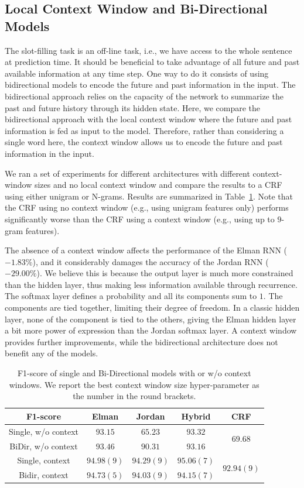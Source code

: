 \subsection{Local Context Window and Bi-Directional Models}

The slot-filling task is an off-line task, i.e., we have access to the whole
sentence at prediction time. It should be beneficial to take advantage of all
future and past available information at any time step. One way to do it
consists of using bidirectional models to encode the future and past
information in the input. The bidirectional approach relies on the capacity of
the network to summarize the past and future history through its hidden state.
Here, we compare the bidirectional approach with the local context window where
the future and past information is fed as input to the model. Therefore, rather
than considering a single word here, the context window allows us to encode the
future and past information in the input.

We ran a set of experiments for different architectures with different
context-window sizes and no local context window and compare the results to a
CRF using either unigram or N-grams. Results are summarized in Table~\ref{tab:bidir}. Note
that the CRF using no context window (e.g., using unigram features only)
performs significantly worse than the CRF using a context window (e.g., using
up to $9$-gram features). 

The absence of a context window affects the performance of the Elman RNN
($-1.83\%$), and it considerably damages the accuracy of the Jordan RNN ($-29.00\%$).
We believe this is because the output layer is much more constrained than the
hidden layer, thus making less information available through recurrence. The
softmax layer defines a probability and all its components sum to $1$. The
components are tied together, limiting their degree of freedom. In a classic
hidden layer, none of the component is tied to the others, giving the Elman
hidden layer a bit more power of expression than the Jordan softmax layer. A
context window provides further improvements, while the bidirectional
architecture does not benefit any of the models.

\begin{table}
\centering
\begin{tabular}{|c|c|c|c|c|}
\hline
F1-score &   Elman &  Jordan &  Hybrid & CRF \\
\hline
Single, w/o context &  $93.15$  & $65.23$  &  $93.32$ & \multirow{2}{*}{$69.68$} \\
BiDir, w/o context &  $93.46$ &   $90.31$  &  $93.16$  & \\ 
\hline
Single, context &  $94.98 (9)$ &  $94.29 (9)$ &   $95.06 (7)$ &    \multirow{2}{*}{$92.94 (9)$} \\
Bidir, context &  $94.73 (5)$ &  $94.03 (9)$ &  $94.15 (7)$ & \\
\hline   
\end{tabular}

\caption{F1-score of single and Bi-Directional models with or w/o context
windows. We report the best context window size hyper-parameter as the number
in the round brackets.}
\label{tab:bidir}
\end{table}

